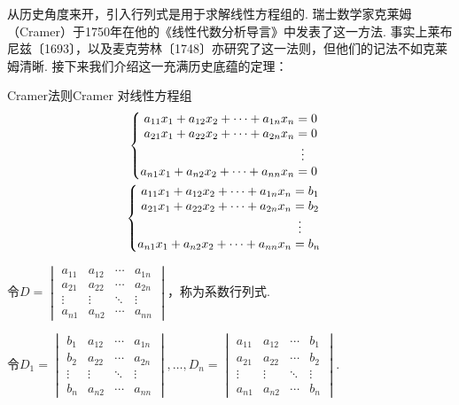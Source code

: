 从历史角度来开，引入行列式是用于求解线性方程组的. 瑞士数学家克莱姆（Cramer）于1750年在他的《线性代数分析导言》中发表了这一方法. 事实上莱布尼兹〔1693〕，以及麦克劳林〔1748〕亦研究了这一法则，但他们的记法不如克莱姆清晰. 接下来我们介绍这一充满历史底蕴的定理：
\begin{theorem}{Cramer法则}{Cramer} 
    对线性方程组
    \begin{gather}
        \label{eq:13:线性方程组1}
        \begin{cases} \begin{aligned}
                a_{11}x_1+a_{12}x_2+\cdots+a_{1n}x_n & = 0             \\
                a_{21}x_1+a_{22}x_2+\cdots+a_{2n}x_n & = 0             \\
                                                     & \vdotswithin{=} \\
                a_{n1}x_1+a_{n2}x_2+\cdots+a_{nn}x_n & = 0
            \end{aligned} \end{cases}
        \\
        \label{eq:13:线性方程组2}
        \begin{cases} \begin{aligned}
                a_{11}x_1+a_{12}x_2+\cdots+a_{1n}x_n & = b_1           \\
                a_{21}x_1+a_{22}x_2+\cdots+a_{2n}x_n & = b_2           \\
                                                     & \vdotswithin{=} \\
                a_{n1}x_1+a_{n2}x_2+\cdots+a_{nn}x_n & = b_n
            \end{aligned} \end{cases}
    \end{gather}

    令$D=\begin{vmatrix}
            a_{11} & a_{12} & \cdots & a_{1n} \\
            a_{21} & a_{22} & \cdots & a_{2n} \\
            \vdots & \vdots & \ddots & \vdots \\
            a_{n1} & a_{n2} & \cdots & a_{nn}
        \end{vmatrix}$，称为系数行列式.

    令$D_1=\begin{vmatrix}
            b_1    & a_{12} & \cdots & a_{1n} \\
            b_2    & a_{22} & \cdots & a_{2n} \\
            \vdots & \vdots & \ddots & \vdots \\
            b_n    & a_{n2} & \cdots & a_{nn}
        \end{vmatrix},\ldots,D_n=\begin{vmatrix}
            a_{11} & a_{12} & \cdots & b_1    \\
            a_{21} & a_{22} & \cdots & b_2    \\
            \vdots & \vdots & \ddots & \vdots \\
            a_{n1} & a_{n2} & \cdots & b_n
        \end{vmatrix}$.


\end{theorem}

